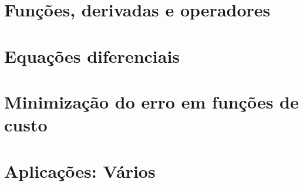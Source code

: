 \documentclass[12pt]{extbook} %
\begin{document}
\part{Funções, derivadas e operadores}





\part{Equações diferenciais}


\part{Minimização do erro em funções de custo}




\part{Aplicações: Vários}



\end{document}
